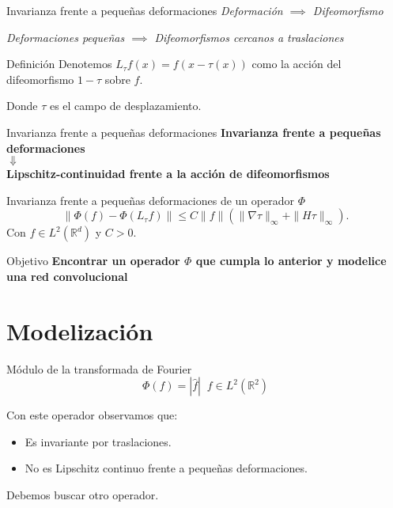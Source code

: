 \documentclass[aspectratio=43]{beamer}
\begin{document}
  \begin{frame}[t]{Invarianza frente a pequeñas deformaciones}
    \textcolor{tudCyan}{\textit{Deformación $\implies$ Difeomorfismo}}

    \textcolor{tudCyan}{\textit{Deformaciones pequeñas $\implies$ Difeomorfismos cercanos a traslaciones}}

    \begin{block}{Definición}
      Denotemos $L_{\tau} f(x)=f(x-\tau(x))$ como la acción del difeomorfismo $1-\tau$ sobre $f$.

      Donde $\tau$ es el campo de desplazamiento.
    \end{block}

  \end{frame}

  \begin{frame}{Invarianza frente a pequeñas deformaciones}
    \textcolor{tudCyan}{\textbf{\centering Invarianza frente a pequeñas deformaciones \\ \centering $\Downarrow$ \\ \centering Lipschitz-continuidad frente a la acción de difeomorfismos}}

    \begin{block}{Invarianza frente a pequeñas deformaciones de un operador $\Phi$}
      \begin{equation*}
        \| \Phi(f)-\Phi(L_{\tau}f)\|\leq C\|f\|(\|\nabla\tau\|_{\infty} + \|H \tau\|_\infty).
      \end{equation*}
      Con $f\in L^2(\mathbb{R}^d)$ y $C>0$.
    \end{block}
  \end{frame}


  \begin{frame}{Objetivo}
    \centering \LARGE \textcolor{tudCyan}{\textbf{Encontrar un operador $\Phi$ que cumpla lo anterior y modelice una red convolucional}}
  \end{frame}

\section{Modelización}

\begin{frame}{Módulo de la transformada de Fourier}
  $$\Phi(f)=|\widehat{f}| \;\; f\in L^2(\mathbb{R}^2)$$

  Con este operador observamos que:
  \begin{itemize}
    \item Es invariante por traslaciones.
    \item No es Lipschitz continuo frente a pequeñas deformaciones.
  \end{itemize}

  Debemos buscar otro operador.
\end{frame}
\end{document}

